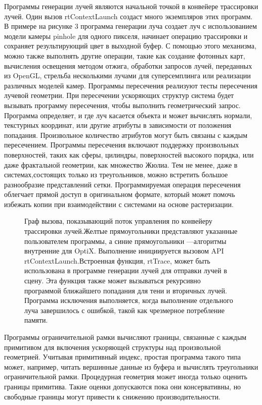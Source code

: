 Программы генерации лучей являются начальной точкой в конвейере трассировки лучей.
Один вызов rtContextLaunch создаст много экземпляров этих программ.
В примере на рисунке 3 программа генерации луча создает луч с использованием модели камеры pinhole для одного пикселя, начинает операцию трассировки и сохраняет результирующий цвет в выходной буфер.
 С помощью этого механизма, можно также выполнять другие операции, такие как создание фотонных карт, вычисления освещения методом отжига, обработки запросов лучей, переданных из OpenGL, стрельба несколькими лучами для суперсемплинга или реализации различных моделей камер.
Программы пересечения реализуют тесты пересечения лучевой геометрии.
При пересечении ускоряющих структур система будет вызывать программу пересечения, чтобы выполнить геометрический запрос.
Программа определяет, и где луч касается объекта и может вычислять нормали, текстурных координат, или другие атрибуты в зависимости от положения попадания.
Произвольное количество атрибутов могут быть связаны с каждым пересечением.
Программы пересечения включают поддержку произвольных поверхностей, таких как сферы, цилиндры, поверхностей высокого порядка, или даже фрактальной геометрии, как множество Жюлиа.
Тем не менее, даже в системах,состоящих только из треугольников, можно встретить большое разнообразие представлений сетки.
Программируемая операция пересечения облегчает прямой доступ в оригинальном формате, который может помочь избежать копии при взаимодействии с системами на основе растеризации.
\begin{figure}[h]
\caption{Граф вызова, показывающий поток управления по конвейеру трассировки лучей.Желтые прямоугольники представляют указанные пользователем программы, а синие прямоугольники ---алгоритмы внутренние для OptiX.
Выполнение инициируется вызовом API rtContextLaunch.Встроенная функция, rtTrace, может быть использована в программе генерации лучей для отправки лучей в сцену.
Эта функция также может вызываться рекурсивно программой ближайшего попадания для тени и вторичных лучей.
Программа исключения выполняется, когда выполнение отдельного луча завершилось с ошибкой, такой как чрезмерное потребление памяти.}
\label{fig:graph-of-calling}
\end{figure}

Программы ограничительной рамки вычисляют границы, связанные с каждым примитивом для включения ускоряющей структуры над произвольной геометрией.
Учитывая примитивный индекс, простая программа такого типа может, например, читать вершинные данные из буфера и вычислять треугольники ограничительной рамки.
Процедурная геометрия может иногда только оценить границы примитива.
Такие оценки допускаются пока они консервативны, но свободные границы могут привести к снижению производительности.

